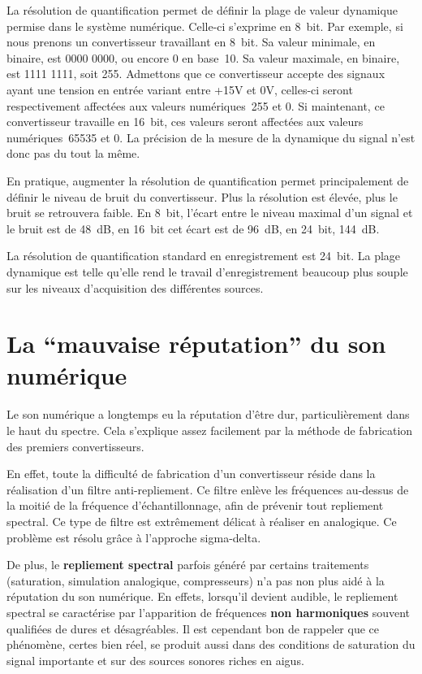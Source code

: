 \documentclass[
]{book}
\begin{document}
La résolution de quantification permet de définir la plage de valeur dynamique permise dans le système numérique. Celle-ci s'exprime en 8~bit. Par exemple, si nous prenons un convertisseur travaillant en 8~bit. Sa valeur minimale, en binaire, est 0000 0000, ou encore 0 en base~10. Sa valeur maximale, en binaire, est 1111 1111, soit 255. Admettons que ce convertisseur accepte des signaux ayant une tension en entrée variant entre +15V et 0V, celles-ci seront respectivement affectées aux valeurs numériques~255 et 0. Si maintenant, ce convertisseur travaille en 16~bit, ces valeurs seront affectées aux valeurs numériques~65535 et 0. La précision de la mesure de la dynamique du signal n'est donc pas du tout la même.

En pratique, augmenter la résolution de quantification permet principalement de définir le niveau de bruit du convertisseur. Plus la résolution est élevée, plus le bruit se retrouvera faible. En 8~bit, l'écart entre le niveau maximal d'un signal et le bruit est de 48~dB, en 16~bit cet écart est de 96~dB, en 24~bit, 144~dB.

La résolution de quantification standard en enregistrement est 24~bit. La plage dynamique est telle qu'elle rend le travail d'enregistrement beaucoup plus souple sur les niveaux d'acquisition des différentes sources.

\hypertarget{la-mauvaise-ruxe9putation-du-son-numuxe9rique}{%
\section{La ``mauvaise réputation'' du son numérique}\label{la-mauvaise-ruxe9putation-du-son-numuxe9rique}}

Le son numérique a longtemps eu la réputation d'être dur, particulièrement dans le haut du spectre. Cela s'explique assez facilement par la méthode de fabrication des premiers convertisseurs.

En effet, toute la difficulté de fabrication d'un convertisseur réside dans la réalisation d'un filtre anti-repliement. Ce filtre enlève les fréquences au-dessus de la moitié de la fréquence d'échantillonnage, afin de prévenir tout repliement spectral. Ce type de filtre est extrêmement délicat à réaliser en analogique. Ce problème est résolu grâce à l'approche sigma-delta.

De plus, le \textbf{repliement spectral} parfois généré par certains traitements (saturation, simulation analogique, compresseurs) n'a pas non plus aidé à la réputation du son numérique. En effets, lorsqu'il devient audible, le repliement spectral se caractérise par l'apparition de fréquences \textbf{non harmoniques} souvent qualifiées de dures et désagréables. Il est cependant bon de rappeler que ce phénomène, certes bien réel, se produit aussi dans des conditions de saturation du signal importante et sur des sources sonores riches en aigus.
\end{document}
